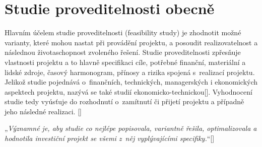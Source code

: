 \documentclass[
	11pt, oneside, printed, draft, 
	table,   %
	lof,     %
	lot     %
]{fithesis3}
\makeatletter
\newcommand{\citepages}[2]{[\cite[#1]{#2}]}
\newcommand{\citace}[1]{„\textit{#1}“} %
\newcommand{\mezera}{\bigskip}
\makeatother
\begin{document}
{\section{Studie proveditelnosti obecně}

Hlavním účelem studie proveditelnosti (feasibility study) je zhodnotit možné varianty, které mohou nastat při provádění projektu, a posoudit realizovatelnost a následnou životaschopnost zvoleného řešení. Studie proveditelnosti zpřesňuje vlastnosti projektu a to hlavně specifikaci cíle, potřebné finanční, materiální a lidské zdroje, časový harmonogram, přínosy a rizika spojená s~realizací projektu. Jelikož studie pojednává o~finančních, technických, managerských i ekonomických aspektech projektu, nazývá se také studií ekonomicko-technickou\citepages{19}{fotr_1995}.
Vyhodnocení studie tedy vyúsťuje do rozhodnutí o~zamítnutí či přijetí projektu a případně jeho následné realizaci.
\citepages{19-20}{fotr_1995} 

\mezera

\citace{Významné je, aby studie co nejlépe popisovala, variantně řešila, optimalizovala a hodnotila investiční projekt se všemi z~něj vyplývajícími specifiky.}\citepages{8}{Sieber2004} 

\mezera

}
\end{document}
